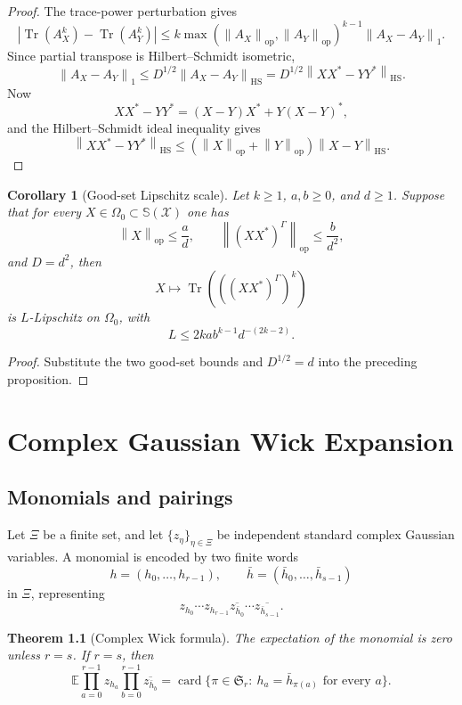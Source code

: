 \documentclass[11pt,oneside]{book}
\newtheorem{theorem}{Theorem}[chapter]
\newtheorem{corollary}[theorem]{Corollary}
\DeclareMathOperator{\Tr}{Tr}
\DeclareMathOperator{\card}{card}
\newcommand{\E}{\mathbb E}
\newcommand{\1}{\mathbf 1}
\newcommand{\Sphere}{\mathbb S}
\newcommand{\pt}{\Gamma}
\newcommand{\HS}{\mathrm{HS}}
\newcommand{\op}{\mathrm{op}}
\newcommand{\norm}[1]{\left\|#1\right\|}
\begin{document}
\begin{proof}
The trace-power perturbation gives
\[
  |\Tr(A_X^k)-\Tr(A_Y^k)|
  \le
  k\max(\norm{A_X}_{\op},\norm{A_Y}_{\op})^{k-1}\norm{A_X-A_Y}_1.
\]
Since partial transpose is Hilbert--Schmidt isometric,
\[
  \norm{A_X-A_Y}_1
  \le D^{1/2}\norm{A_X-A_Y}_{\HS}
  =D^{1/2}\norm{XX^*-YY^*}_{\HS}.
\]
Now
\[
  XX^*-YY^*=(X-Y)X^*+Y(X-Y)^*,
\]
and the Hilbert--Schmidt ideal inequality gives
\[
  \norm{XX^*-YY^*}_{\HS}
  \le(\norm X_{\op}+\norm Y_{\op})\norm{X-Y}_{\HS}.
\]
\end{proof}

\begin{corollary}[Good-set Lipschitz scale]
Let \(k\ge1\), \(a,b\ge0\), and \(d\ge1\).  Suppose that for every
\(X\in\Omega_0\subset\Sphere(\mathcal X)\) one has
\[
  \norm X_{\op}\le \frac a d,\qquad
  \norm{(XX^*)^\pt}_{\op}\le \frac b{d^2},
\]
and \(D=d^2\), then
\[
  X\mapsto \Tr\left(\left((XX^*)^\pt\right)^k\right)
\]
is \(L\)-Lipschitz on \(\Omega_0\), with
\[
  L\le 2kab^{k-1}d^{-(2k-2)}.
\]
\end{corollary}

\begin{proof}
Substitute the two good-set bounds and \(D^{1/2}=d\) into the preceding
proposition.
\end{proof}

\chapter{Complex Gaussian Wick Expansion}

\section{Monomials and pairings}

Let \(\Xi\) be a finite set, and let \(\{z_\eta\}_{\eta\in\Xi}\) be
independent standard complex Gaussian variables.  A monomial is encoded by
two finite words
\[
  h=(h_0,\ldots,h_{r-1}),\qquad
  \bar h=(\bar h_0,\ldots,\bar h_{s-1})
\]
in \(\Xi\), representing
\[
  z_{h_0}\cdots z_{h_{r-1}}
  \overline{z_{\bar h_0}}\cdots\overline{z_{\bar h_{s-1}}}.
\]

\begin{theorem}[Complex Wick formula]
The expectation of the monomial is zero unless \(r=s\).  If \(r=s\), then
\[
  \E\prod_{a=0}^{r-1}z_{h_a}
    \prod_{b=0}^{r-1}\overline{z_{\bar h_b}}
  =
  \card\{\pi\in\mathfrak S_r:\ h_a=\bar h_{\pi(a)}
       \text{ for every }a\}.
\]
\end{theorem}
\end{document}
